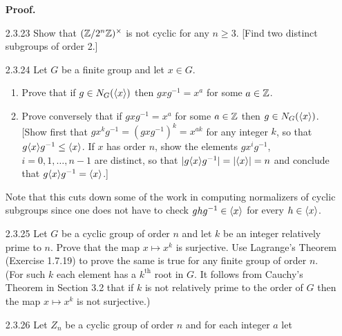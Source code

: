\begin{enumerate}
      \textbf{Proof.}
   \item[2.3.23]  Show that $(\mathbb{Z}/2^n\mathbb{Z})^\times$ is not cyclic for any $n \ge 3$.
                  [Find two distinct subgroups of order 2.]
   \item[2.3.24]  Let $G$ be a finite group and let $x \in G$.
                  \begin{enumerate}
                     \item Prove that if $g \in N_G(\langle x \rangle)$ then
                           $gxg^{-1} = x^a$ for some $a \in \mathbb{Z}$. 
                     \item Prove conversely that if $gxg^{-1} = x^a$ for some
                           $a \in \mathbb{Z}$ then $g \in N_G(\langle x \rangle)$. [Show first
                           that $gx^kg^{-1} = (gxg^{-1})^k = x^{ak}$ for any
                           integer $k$, so that $g\langle x \rangle g^{-1} \le \langle x \rangle$.
                           If $x$ has order $n$, show the elements $gx^ig^{-1}$,
                           $i = 0, 1, \ldots, n-1$ are distinct, so that
                           $|g\langle x \rangle g^{-1}| = |\langle x \rangle| = n$ and conclude that
                           $g\langle x \rangle g^{-1} = \langle x \rangle$.]
                  \end{enumerate}
                  Note that this cuts down some of the work in computing
                  normalizers of cyclic subgroups since one does not have to
                  check $ghg^{-1} \in \langle x \rangle$ for every $h \in \langle x \rangle$.
   \item[2.3.25]  Let $G$ be a cyclic group of order $n$ and let $k$ be an
                  integer relatively prime to $n$. Prove that the map
                  $x \mapsto x^k$ is surjective. Use Lagrange's Theorem
                  (Exercise 1.7.19) to prove the same is true for any finite
                  group of order $n$. (For such $k$ each element has a
                  $k^{\text{th}}$ root in $G$. It follows from Cauchy's Theorem
                  in Section 3.2 that if $k$ is not relatively prime to the
                  order of $G$ then the map $x \mapsto x^k$ is not surjective.)
   \item[2.3.26]  Let $Z_n$ be a cyclic group of order $n$ and for each integer
                  $a$ let

\end{enumerate}
